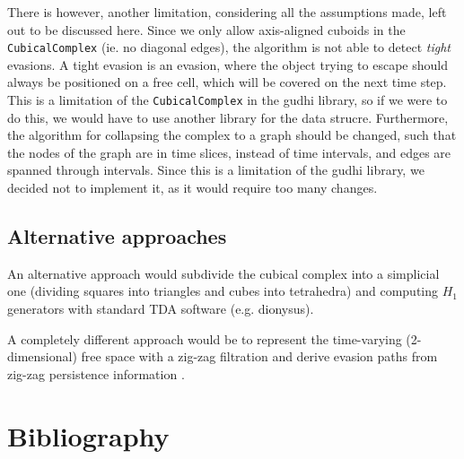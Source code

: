 \documentclass{article}
\begin{document}
There is however, another limitation, considering all the assumptions made, left out to be discussed here.
Since we only allow axis-aligned cuboids in the \texttt{CubicalComplex} (ie. no diagonal edges), the algorithm is not able to detect \textit{tight} evasions.
A tight evasion is an evasion, where the object trying to escape should always be positioned on a free cell, which will be covered on the next time step.
This is a limitation of the \texttt{CubicalComplex} in the gudhi library, so if we were to do this, we would have to use another library for the data strucre.
Furthermore, the algorithm for collapsing the complex to a graph should be changed, such that the nodes of the graph are in time slices, instead of time intervals, and edges are spanned through intervals.
Since this is a limitation of the gudhi library, we decided not to implement it, as it would require too many changes.

\subsection*{Alternative approaches}

An alternative approach would subdivide the cubical complex into a simplicial one (dividing squares into triangles and cubes into tetrahedra) and computing $H_1$ generators with standard TDA software (e.g. dionysus).

A completely different approach would be to represent the time-varying (2-dimensional) free space with a zig-zag filtration and derive evasion paths from zig-zag persistence information \cite{Adams_2014}.


\section{Bibliography}

\printbibliography
\end{document}
